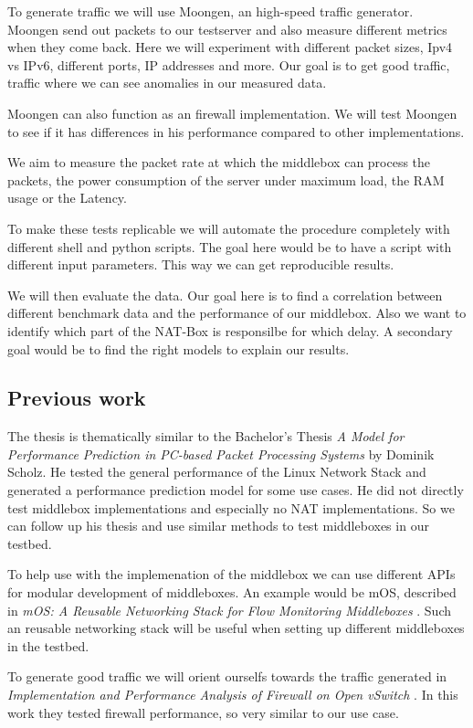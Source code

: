 \documentclass[NET,a4,12pt,ngerman]{netforms}
\begin{document}
To generate traffic we will use Moongen, an high-speed traffic generator. Moongen send out packets to our testserver and also measure different metrics when they come back. 
Here we will experiment with different packet sizes, Ipv4 vs IPv6, different ports, IP addresses and more. Our goal is to get good traffic, traffic where we can see anomalies in our measured data. 

Moongen can also function as an firewall implementation. We will test Moongen to see if it has differences in his performance compared to other implementations. 

We aim to measure the packet rate at which the middlebox can process the packets, the power consumption of the server under maximum load, the RAM usage or the Latency.

To make these tests replicable we will automate the procedure completely with different shell and python scripts. The goal here would be to have a script with different input parameters. This way we can get reproducible results. 

We will then evaluate the data. Our goal here is to find a correlation between different benchmark data and the performance of our middlebox. Also we want to identify which part of the NAT-Box is responsilbe for which delay. A secondary goal would be to find the right models to explain our results.


\subsection*{Previous work}

The thesis is thematically similar to the Bachelor's Thesis \emph{A Model for Performance Prediction
in PC-based Packet Processing Systems} \cite{WORK:1} by
Dominik Scholz. He tested the general performance of the Linux Network Stack and generated a performance prediction model for some use cases. 
He did not directly test middlebox implementations and especially no NAT implementations. So we can follow up his thesis and use similar methods to test middleboxes in our testbed. 

To help use with the implemenation of the middlebox we can use different APIs for modular development of middleboxes. An example would be mOS, described in \emph{mOS: A Reusable Networking Stack for Flow Monitoring Middleboxes} \cite{WORK:2}. Such an reusable networking stack will be useful when setting up different middleboxes in the testbed.

To generate good traffic we will orient ourselfs towards the traffic generated in \emph{Implementation and Performance Analysis of Firewall on Open vSwitch} \cite{Work:4}. In this work they tested firewall performance, so very similar to our use case.  
\end{document}
